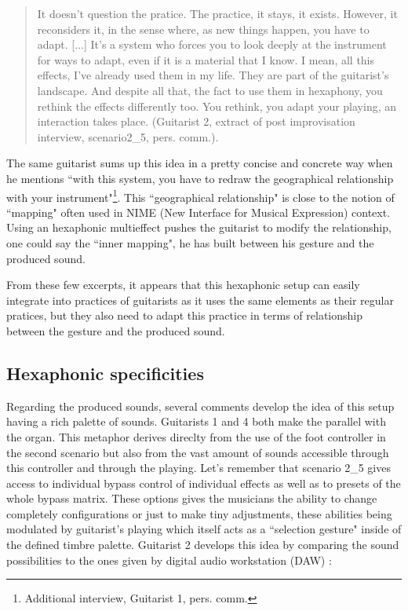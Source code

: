 \documentclass{article}
\begin{document}
    \begin{quote}
     It doesn't question the pratice. The practice, it stays, it exists. However, it reconsiders it, in the sense where, as new things happen, you have to adapt. [...] It's a system who forces you to look deeply at the instrument for ways to adapt, even if it is a material that I know. I mean, all this effects, I've already used them in my life. They are part of the guitarist's landscape. And despite all that, the fact to use them in hexaphony, you rethink the effects differently too. You rethink, you adapt your playing, an interaction takes place. (Guitarist 2, extract of post improvisation interview, scenario2\_5, pers. comm.).
    \end{quote}

The same guitarist sums up this idea in a pretty concise and concrete way when he mentions ``with this system, you have to redraw the geographical relationship with your instrument"\footnote{Additional interview, Guitarist 1, pers. comm.}. This ``geographical relationship" is close to the notion of ``mapping" often used in NIME (New Interface for Musical Expression) context. Using an hexaphonic multieffect pushes the guitarist to modify the relationship, one could say the ``inner mapping", he has built between his gesture and the produced sound. 

From these few excerpts, it appears that this hexaphonic setup can easily integrate into practices of guitarists as it uses the same elements as their regular pratices, but they also need to adapt this practice in terms of relationship between the gesture and the produced sound.




\subsection{Hexaphonic specificities}

Regarding the produced sounds, several comments develop the idea of this setup having a rich palette of sounds. Guitarists 1 and 4 both make the parallel with the organ. This metaphor derives direclty from the use of the foot controller in the second scenario but also from the vast amount of sounds accessible through this controller  and through the playing.  Let's remember that scenario 2\_5 gives access to individual bypass control of individual effects as well as to presets of the whole bypass matrix. These options gives the musicians the ability to change completely configurations or just to make tiny adjustments, these abilities being modulated by guitarist's playing which itself acts as a ``selection gesture" \cite{sci:Cadoz94} inside of the defined timbre palette.
Guitarist 2 develops this idea by comparing the sound possibilities to the ones given by digital audio workstation (DAW) : 
\end{document}

